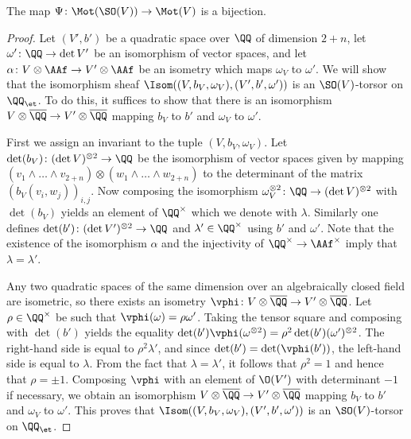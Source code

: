 \begin{lemma}\label{lem:mot(SO)_ito_motives}
The map $\Psi\colon \Mot(\SO(V)) \rightarrow \Mot(V)$ is a bijection.
\end{lemma}
\begin{proof}
Let $(V',b')$ be a quadratic space over $\QQ$ of dimension $2 + n$, let $\omega'\colon \QQ \rightarrow \det V'$ be an isomorphism of vector spaces, and let $\alpha\colon V \otimes \AAf \rightarrow V' \otimes \AAf$ be an isometry which maps $\omega_V$ to $\omega'$. We will show that the isomorphism sheaf $\Isom((V,b_V,\omega_V),(V',b',\omega'))$ is an $\SO(V)$-torsor on $\QQ_{\et}$. To do this, it suffices to show that there is an isomorphism $V \otimes \overline{\QQ} \rightarrow V' \otimes \overline{\QQ}$ mapping $b_V$ to $b'$ and $\omega_V$ to $\omega'$.

First we assign an invariant to the tuple $(V,b_V,\omega_V)$. Let $\det(b_V)\colon (\det V)^{\otimes 2} \rightarrow \QQ$ be the isomorphism of vector spaces given by mapping $(v_1 \wedge \ldots \wedge v_{2 + n}) \otimes (w_1 \wedge \ldots \wedge w_{2 + n})$ to the determinant of the matrix $(b_V(v_i,w_j))_{i,j}$. Now composing the isomorphism $\omega^{\otimes 2}_V\colon \QQ \rightarrow (\det V)^{\otimes 2}$ with $\det(b_V)$ yields an element of $\QQ^{\times}$ which we denote with $\lambda$. Similarly one defines $\det(b')\colon (\det V')^{\otimes 2} \rightarrow \QQ$ and $\lambda'\in \QQ^{\times}$ using $b'$ and $\omega'$. Note that the existence of the isomorphism $\alpha$ and the injectivity of $\QQ^{\times} \rightarrow \AAf^{\times}$ imply that $\lambda = \lambda'$.

    Any two quadratic spaces of the same dimension over an algebraically closed field are isometric, so there exists an isometry $\vphi\colon V \otimes \overline{\QQ} \rightarrow V' \otimes \overline{\QQ}$. Let $\rho \in \QQ^{\times}$ be such that $\vphi(\omega) = \rho \omega'$. Taking the tensor square and composing with $\det(b')$ yields the equality $\det(b')\vphi(\omega^{\otimes 2}) = \rho^2 \det(b')(\omega')^{\otimes 2}$. The right-hand side is equal to $\rho^2 \lambda'$, and since $\det(b') = \det(\vphi(b'))$, the left-hand side is equal to $\lambda$. From the fact that $\lambda = \lambda'$, it follows that $\rho^2 = 1$ and hence that $\rho = \pm 1$. Composing $\vphi$ with an element of $\O(V')$ with determinant $-1$ if necessary, we obtain an isomorphism $V \otimes \overline{\QQ} \rightarrow V' \otimes \overline{\QQ}$ mapping $b_V$ to $b'$ and $\omega_V$ to $\omega'$. This proves that $\Isom((V,b_V,\omega_V),(V',b',\omega'))$ is an $\SO(V)$-torsor on $\QQ_{\et}$.


\end{proof}
